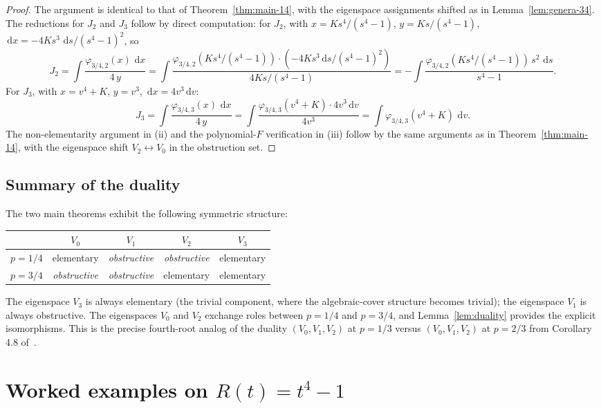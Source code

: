 \documentclass[11pt,a4paper]{article}
\theoremstyle{plain}
\theoremstyle{definition}
\theoremstyle{remark}
\renewcommand{\d}{\,\mathrm{d}}
\begin{document}
\begin{proof}
The argument is identical to that of Theorem~\ref{thm:main-14}, with the eigenspace assignments shifted as in Lemma~\ref{lem:genera-34}. The reductions for $J_2$ and $J_3$ follow by direct computation: for $J_2$, with $x = Ks^4/(s^4-1)$, $y = Ks/(s^4-1)$, $\d x = -4K s^3\,\d s/(s^4-1)^2$, so
\[
  J_2 = \int \frac{\varphi_{3/4,2}(x)\,\d x}{4\,y} = \int \frac{\varphi_{3/4,2}(K s^4/(s^4-1)) \cdot (-4K s^3 \d s/(s^4-1)^2)}{4 K s/(s^4 - 1)} = -\!\int \frac{\varphi_{3/4,2}(K s^4/(s^4-1))\,s^2\,\d s}{s^4 - 1}.
\]
For $J_3$, with $x = v^4 + K$, $y = v^3$, $\d x = 4 v^3 \d v$:
\[
  J_3 = \int \frac{\varphi_{3/4,3}(x)\,\d x}{4\,y} = \int \frac{\varphi_{3/4,3}(v^4 + K) \cdot 4 v^3 \d v}{4 v^3} = \int \varphi_{3/4,3}(v^4 + K)\,\d v.
\]
The non-elementarity argument in (ii) and the polynomial-$F$ verification in (iii) follow by the same arguments as in Theorem~\ref{thm:main-14}, with the eigenspace shift $V_2 \leftrightarrow V_0$ in the obstruction set.
\end{proof}

\subsection*{Summary of the duality}

The two main theorems exhibit the following symmetric structure:
\begin{center}
\begin{tabular}{c|cccc}
& $V_0$ & $V_1$ & $V_2$ & $V_3$ \\
\hline
$p = 1/4$ & elementary & \emph{obstructive} & \emph{obstructive} & elementary \\
$p = 3/4$ & \emph{obstructive} & \emph{obstructive} & elementary & elementary
\end{tabular}
\end{center}

The eigenspace $V_3$ is always elementary (the trivial component, where the algebraic-cover structure becomes trivial); the eigenspace $V_1$ is always obstructive. The eigenspaces $V_0$ and $V_2$ exchange roles between $p = 1/4$ and $p = 3/4$, and Lemma~\ref{lem:duality} provides the explicit isomorphisms. This is the precise fourth-root analog of the duality $(V_0, V_1, V_2)$ at $p = 1/3$ versus $(V_0, V_1, V_2)$ at $p = 2/3$ from Corollary 4.8 of~\cite{GoursatCubic}.

\section{Worked examples on \texorpdfstring{$R(t) = t^4 - 1$}{R(t) = t\^{}4 - 1}}\label{sec:examples}
\end{document}
